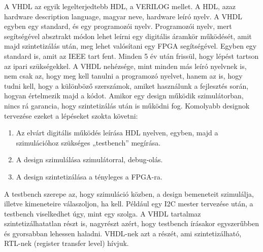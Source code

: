 \documentclass[a4paper,12pt,oneside]{book}
\begin{document}
A VHDL az egyik legelterjedtebb HDL, a VERILOG mellet. A HDL, azaz hardware description language, magyar neve, hardware leíró nyelv. A VHDL egyben egy standard, és egy programozói nyelv. Programozói nyelv, mert segítségével absztrakt módon lehet leírni egy digitális áramkör működését, amit majd szintetizálás után, meg lehet valósítani egy FPGA segítségével. Egyben egy standard is, amit az IEEE tart fent. Minden 5 év után frissül, hogy lépést tartson az ipari szükségekkel. A VHDL nehézsége, mint minden más leíró nyelvnek is, nem csak az, hogy meg kell tanulni a programozó nyelvet, hanem az is, hogy tudni kell, hogy a különböző szerszámok, amiket használunk a fejlesztés során, hogyan értelmezik majd a kódot. Amikor egy design működik szimulátorban, nincs rá garancia, hogy szintetizálás után is működni fog. Komolyabb designok tervezése ezeket a lépéseket szokta követni:
\begin{enumerate}[label=(\alph*)]
	\item Az elvárt digitális működés leírása HDL nyelven, egyben, majd a szimulációhoz szükséges „testbench” megírása.
	\item A design szimulálása szimulátorral, debug-olás.
	\item A design szintetizálása a tényleges a FPGA-ra. 
\end{enumerate}
A testbench szerepe az, hogy szimuláció közben, a design bemeneteit szimulálja, illetve kimeneteire válaszoljon, ha kell. Például egy I2C mester tervezése után, a testbench viselkedhet úgy, mint egy szolga. A VHDL tartalmaz szintetizálhatatlan részt is, nagyrészt azért, hogy testbench írásakor egyszerűbben és gyorsabban lehessen haladni. VHDL-nek azt a részét, ami szintetizálható, RTL-nek (register transfer level) hívjuk.
\end{document}

